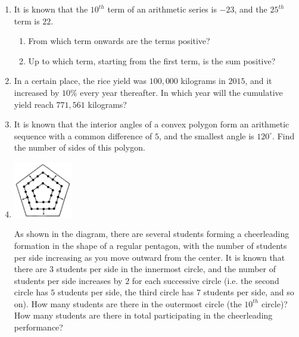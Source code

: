 \documentclass{report}
\begin{document}
\begin{enumerate}
            \item It is known that the $10^{th}$ term of an arithmetic series is $-23$, and the $25^{th}$ term is $22$.
            
            \begin{enumerate}
                \item From which term onwards are the terms positive?
            
                \item Up to which term, starting from the first term, is the sum positive?
            \end{enumerate}
            
            \item In a certain place, the rice yield was $100,000$ kilograms in $2015$, and it increased by $10\%$ every year thereafter. In which year will the cumulative yield reach $771,561$ kilograms?
            
            \item It is known that the interior angles of a convex polygon form an arithmetic sequence with a common difference of $5$, and the smallest angle is $120^{\circ}$. Find the number of sides of this polygon.
            
            \item \parbox[t]{\textwidth}{
                \begin{center}
                    \includegraphics[width=0.2\textwidth]{assets/13-14.jpg}
                \end{center}
            }
            As shown in the diagram, there are several students forming a cheerleading formation in the shape of a regular pentagon, with the number of students per side increasing as you move outward from the center. It is known that there are $3$ students per side in the innermost circle, and the number of students per side increases by $2$ for each successive circle (i.e. the second circle has $5$ students per side, the third circle has $7$ students per side, and so on). How many students are there in the outermost circle (the $10^{th}$ circle)? How many students are there in total participating in the cheerleading performance?


\end{enumerate}
\end{document}

